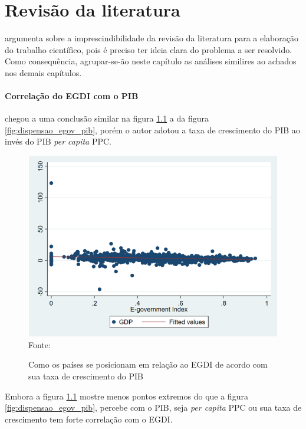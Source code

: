 \chapter{Revisão da literatura}

\cite{echer2001revisao} argumenta sobre a imprescindibilidade da revisão da literatura para a elaboração do trabalho científico, pois é preciso ter ideia clara do problema a ser resolvido. Como consequência, agrupar-se-ão neste capítulo as análises similires ao achados nos demais capítulos.

\subsubsection{Correlação do EGDI com o PIB}

\cite{alisherovna2021whether} chegou a uma conclusão similar na figura \ref{fig:usmanova_egdi_gdp} a da figura \ref{fig:dispensao_egov_pib}, porém o autor adotou a taxa de crescimento do PIB ao invés do PIB \textit{per capita} PPC.

\begin{figure}[H]
	\centering
	\caption{Como os países se posicionam em relação ao EGDI de acordo com sua taxa de crescimento do PIB}
	\includegraphics[width=1\linewidth]{figuras/egdi/usmanova_egdi_gdp}
	\label{fig:usmanova_egdi_gdp}
	\footnotesize{Fonte: \cite{alisherovna2021whether}}
\end{figure}

Embora a figura \ref{fig:usmanova_egdi_gdp} mostre menos pontos extremos do que a figura \ref{fig:dispensao_egov_pib}, percebe com o PIB, seja \textit{per capita} PPC ou sua taxa de crescimento tem forte correlação com o EGDI. 


